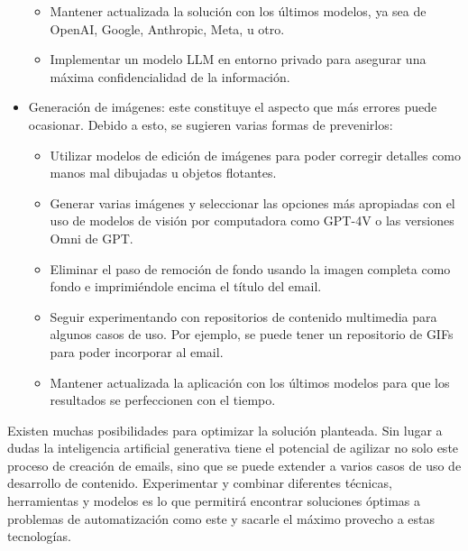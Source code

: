 \begin{itemize}
\begin{itemize}
        \item Mantener actualizada la solución con los últimos modelos, ya sea de OpenAI, Google, Anthropic, Meta, u otro.
        \item Implementar un modelo LLM en entorno privado para asegurar una máxima confidencialidad de la información.
    \end{itemize}
    \item Generación de imágenes: este constituye el aspecto que más errores puede ocasionar. Debido a esto, se sugieren varias formas de prevenirlos:
    \begin{itemize}
        \item Utilizar modelos de edición de imágenes para poder corregir detalles como manos mal dibujadas u objetos flotantes.
        \item Generar varias imágenes y seleccionar las opciones más apropiadas con el uso de modelos de visión por computadora como GPT-4V \cite{openai2023gpt4v} o las versiones Omni de GPT.
        \item Eliminar el paso de remoción de fondo usando la imagen completa como fondo e imprimiéndole encima el título del email.
        \item Seguir experimentando con repositorios de contenido multimedia para algunos casos de uso. Por ejemplo, se puede tener un repositorio de GIFs para poder incorporar al email.
        \item Mantener actualizada la aplicación con los últimos modelos para que los resultados se perfeccionen con el tiempo.
    \end{itemize}
\end{itemize}

Existen muchas posibilidades para optimizar la solución planteada. Sin lugar a dudas la inteligencia artificial generativa tiene el potencial de agilizar no solo este proceso de creación de emails, sino que se puede extender a varios casos de uso de desarrollo de contenido. Experimentar y combinar diferentes técnicas, herramientas y modelos es lo que permitirá encontrar soluciones óptimas a problemas de automatización como este y sacarle el máximo provecho a estas tecnologías.